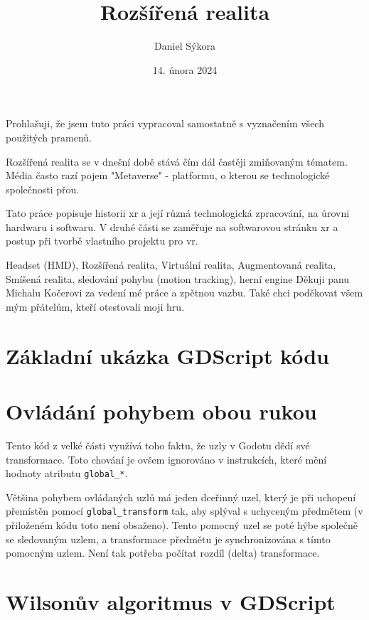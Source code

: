 \documentclass[12pt]{report}
\author{Daniel Sýkora}
\title{Rozšířená realita}
\date{14. února 2024}
\begin{document}
\mytitlepage
\prohlaseni
{
	Prohlašuji, že jsem tuto práci vypracoval samostatně s vyznačením všech použitých pramenů.
}
\abstrakt
{ %
	Rozšířená realita se v dnešní době stává čím dál častěji zmiňovaným tématem. Média často razí pojem "Metaverse" - platformu, o kterou se technologické společnosti přou.

	Tato práce popisuje historii \gls{xr} a její různá technologická zpracování, na úrovni hardwaru i softwaru. V druhé části se zaměřuje na softwarovou stránku \gls{xr} a postup při tvorbě vlastního projektu pro \gls{vr}.
}
{ %
	Headset (HMD), Rozšířená realita, Virtuální realita, Augmentovaná realita, Smíšená realita, sledování pohybu (motion tracking), herní engine
}
\podekovani
{
	Děkuji panu Michalu Kočerovi za vedení mé práce a zpětnou vazbu. Také chci poděkovat všem mým přátelům, kteří otestovali moji hru.
}

\tableofcontents
\newpage






\nocite{*}

\printbibliography

\printglossary[title={Zkratky}]

\listoffigures
{}

\appendix

\chapter{Základní ukázka GDScript kódu}\label{apx_gscript_sample}


\chapter{Ovládání pohybem obou rukou}\label{apx_gripped_object_transformation}
Tento kód z velké části využívá toho faktu, že uzly v Godotu dědí své transformace. Toto chování je ovšem ignorováno v instrukcích, které mění hodnoty atributu \texttt{global\_*}.

Většina pohybem ovládaných uzlů má jeden dceřinný uzel, který je při uchopení přemístěn pomocí \texttt{global\_transform} tak, aby splýval s uchyceným předmětem (v přiloženém kódu toto není obsaženo). Tento pomocný uzel se poté hýbe společně se sledovaným uzlem, a transformace předmětu je synchronizována s tímto pomocným uzlem. Není tak potřeba počítat rozdíl (delta) transformace.



\chapter{Wilsonův algoritmus v GDScript}\label{apx_mazegen}

\end{document}
